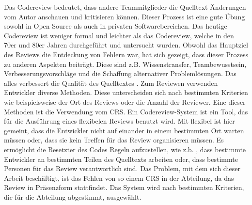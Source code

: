 
Das Codereview bedeutet, dass andere Teammitglieder die Quelltext-Änderungen vom Autor anschauen und kritisieren können. Dieser Prozess ist eine gute Übung sowohl in Open Source als auch in privaten Softwarebereichen. Das heutige Codereview ist weniger formal und leichter als das Codereview, welche in den 70er und 80er Jahren durchgeführt und untersucht wurden. Obwohl das Hauptziel des Reviews die Entdeckung von Fehlern war, hat sich gezeigt, dass dieser Prozess zu anderen Aspekten beiträgt. Diese sind z.B.  Wissenstransfer, Teambewusstsein, Verbesserungsvorschläge und die Schaffung alternativer Problemlösungen. Das alles verbessert die Qualität des Quelltextes \cite{bacchelli2013expectations}.
Zum Reviewen verwenden Entwickler diverse Methoden. Diese unterscheiden sich nach bestimmten Kriterien wie beispielsweise der Ort des Reviews oder die Anzahl der Reviewer. Eine dieser Methoden ist die Verwendung vom \ac{CRS}.
Ein Codereview-System ist ein Tool, das für die Ausführung eines flexibelen Reviews benutzt wird. Mit flexibel ist hier gemeint, dass die Entwickler nicht auf einander in einem bestimmten Ort warten müssen oder, dass sie kein Treffen für das Review organisieren müssen. Es ermöglicht die Besetzter des Codes Regeln aufzustellen, wie z.b. , dass bestimmte Entwickler an bestimmten Teilen des Quelltexts arbeiten oder, dass bestimmte Personen für das Review verantwortlich sind. Das Problem, mit dem sich dieser Arbeit beschäftigt, ist das Fehlen von so einem \ac{CRS} in der Abteilung, da das Review in Präsenzform stattfindet. Das System wird nach bestimmten Kriterien, die für die Abteilung abgestimmt, ausgewählt.